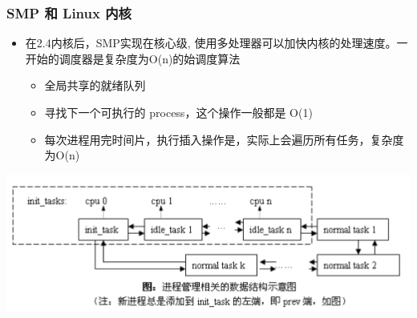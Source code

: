 \begin{frame}
	\frametitle{SMP 和 Linux 内核}

	\begin{itemize}
	
	\item 在2.4内核后，SMP实现在核心级, 使用多处理器可以加快内核的处理速度。一开始的调度器是复杂度为O(n)的始调度算法
	
		\begin{itemize}
		\item 全局共享的就绪队列
		\item 寻找下一个可执行的 process，这个操作一般都是 O(1)
		\item 每次进程用完时间片，执行插入操作是，实际上会遍历所有任务，复杂度为O(n)

		\end{itemize}
	\end{itemize}
	
	\includegraphics[width=.8\textwidth]{figs/linux-2.4-sched.png}


\end{frame}

